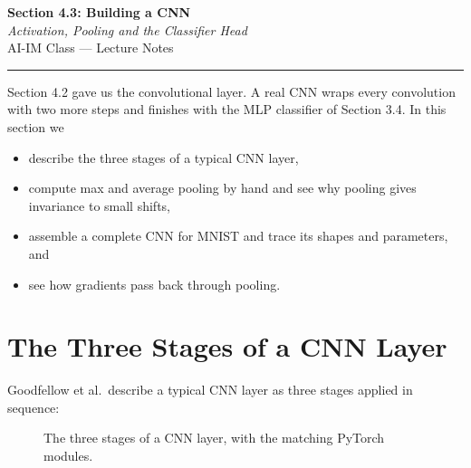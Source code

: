 \documentclass[12pt, a4paper]{article}
\providecommand{\bZ}{\mathbf{Z}}
\providecommand{\bH}{\mathbf{H}}
\begin{document}
\begin{center}
  {\LARGE \textbf{Section 4.3: Building a CNN}} \\[0.3em]
  {\large\itshape Activation, Pooling and the Classifier Head} \\[0.5em]
  {\large AI-IM Class --- Lecture Notes}%
  \ifstudentmode
  \fi
\end{center}

\vspace{1em}
\hrule
\vspace{1.5em}

Section 4.2 gave us the convolutional layer. A real CNN wraps every
convolution with two more steps and finishes with the MLP classifier of
Section 3.4. In this section we
\begin{itemize}[nosep]
  \item describe the three stages of a typical CNN layer,
  \item compute max and average pooling by hand and see why pooling gives
        invariance to small shifts,
  \item assemble a complete CNN for MNIST and trace its shapes and
        parameters, and
  \item see how gradients pass back through pooling.
\end{itemize}

\section{The Three Stages of a CNN Layer}

Goodfellow et al.\ describe a typical CNN layer as three stages applied in
sequence:

\begin{figure}[H]
  \centering
  \caption{The three stages of a CNN layer, with the matching PyTorch modules.}
  \label{fig:stages}
\end{figure}
\end{document}
